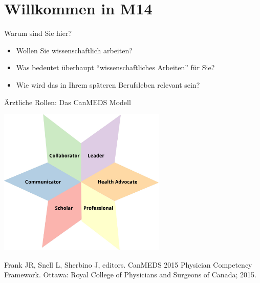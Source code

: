 \documentclass{beamer}
\begin{document}

\section{Willkommen in M14}


\begin{frame}{Warum sind Sie hier?}

\begin{itemize}
    \item 
Wollen Sie wissenschaftlich arbeiten?
\item 
Was bedeutet überhaupt  ``wissenschaftliches Arbeiten'' für Sie? 
\item 
Wie wird das in Ihrem späteren Berufsleben relevant sein? 
    
\end{itemize}
    
\end{frame}

\begin{frame}{Ärztliche Rollen: Das CanMEDS Modell}

\begin{center}
    \includegraphics[width=0.6\textwidth]{CanMEDs.jpg}
\end{center}

\tiny{Frank JR, Snell L, Sherbino J, editors. CanMEDS 2015 Physician
Competency Framework. Ottawa: Royal College of Physicians
and Surgeons of Canada; 2015.}


\end{frame}
\end{document}
